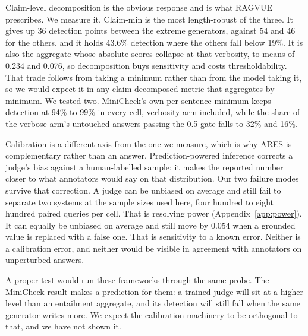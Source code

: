 Claim-level decomposition is the obvious response and is what RAGVUE prescribes. We measure it. Claim-min is the most length-robust of the three. It gives up 36 detection points between the extreme generators, against 54 and 46 for the others, and it holds 43.6\% detection where the others fall below 19\%. It is also the aggregate whose absolute scores collapse at that verbosity, to means of 0.234 and 0.076, so decomposition buys sensitivity and costs thresholdability. That trade follows from taking a minimum rather than from the model taking it, so we would expect it in any claim-decomposed metric that aggregates by minimum. We tested two. MiniCheck's own per-sentence minimum keeps detection at 94\% to 99\% in every cell, verbosity arm included, while the share of the verbose arm's untouched answers passing the 0.5 gate falls to 32\% and 16\%.

Calibration is a different axis from the one we measure, which is why ARES is complementary rather than an answer. Prediction-powered inference \citep{angelopoulos-etal-2023} corrects a judge's bias against a human-labelled sample: it makes the reported number closer to what annotators would say on that distribution. Our two failure modes survive that correction. A judge can be unbiased on average and still fail to separate two systems at the sample sizes used here, four hundred to eight hundred paired queries per cell. That is resolving power (Appendix~\ref{app:power}). It can equally be unbiased on average and still move by 0.054 when a grounded value is replaced with a false one. That is sensitivity to a known error. Neither is a calibration error, and neither would be visible in agreement with annotators on unperturbed answers.

A proper test would run these frameworks through the same probe. The MiniCheck result makes a prediction for them: a trained judge will sit at a higher level than an entailment aggregate, and its detection will still fall when the same generator writes more. We expect the calibration machinery to be orthogonal to that, and we have not shown it.
